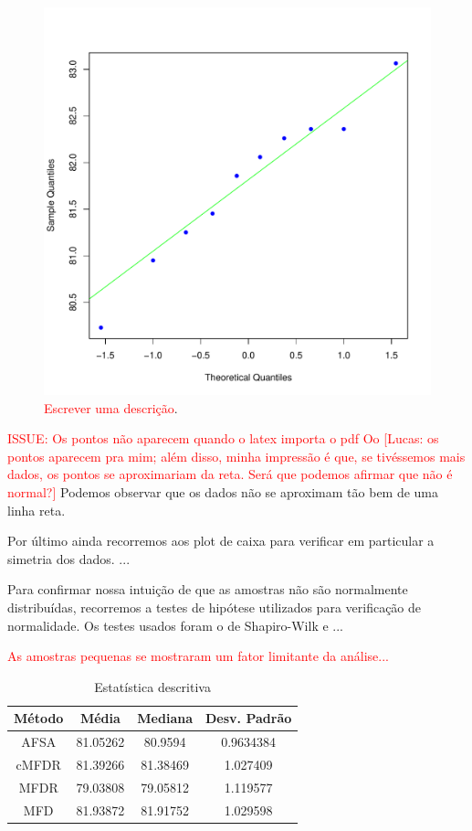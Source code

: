 \documentclass[conference]{IEEEtran}
\begin{document}
\begin{figure}[h]
	\centering
	\includegraphics[width=\linewidth]{img/bluenorm_mfd.pdf}
	\caption{\textcolor{red}{Escrever uma descrição}.}
	\label{fig:hist_mfd}
\end{figure}

\textcolor{red}{ISSUE: Os pontos não aparecem quando o latex importa o pdf Oo [Lucas: os pontos aparecem pra mim; além disso, minha impressão é que, se tivéssemos mais dados, os pontos se aproximariam da reta. Será que podemos afirmar que não é normal?]}
Podemos observar que os dados não se aproximam tão bem de uma linha reta.

Por último ainda recorremos aos plot de caixa para verificar em particular a simetria dos dados. ...

Para confirmar nossa intuição de que as amostras não são normalmente distribuídas, recorremos a testes de hipótese utilizados para verificação de normalidade.
Os testes usados foram o de Shapiro-Wilk \cite{shapiro1965analysis} e ...	

\textcolor{red}{As amostras pequenas se mostraram um fator limitante da análise...}

\begin{table}[h]
	\centering
	\caption{Estatística descritiva}
	\label{tab:est_descr}
	\begin{tabular}{cccc}
		Método    & Média  & Mediana & Desv. Padrão  \\
		\hline
		AFSA&		81.05262 	& 80.9594 	& 0.9634384 \\
		cMFDR&      81.39266 	& 81.38469 	& 1.027409 \\
		MFDR& 		79.03808 	& 79.05812 	& 1.119577 \\
		MFD&     	81.93872 	& 81.91752 	& 1.029598 \\
		\hline
	\end{tabular}
\end{table}
\end{document}
